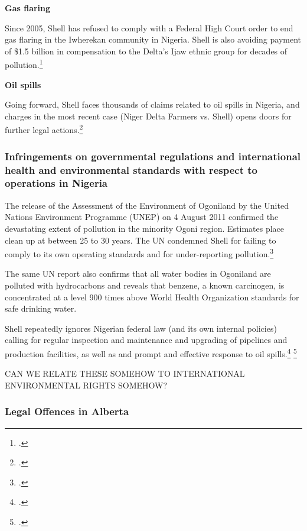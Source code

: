 \textbf{Gas flaring}

Since 2005, Shell has refused to comply with a Federal High Court order to end gas flaring in the Iwherekan community in Nigeria. Shell is also avoiding payment of \$1.5 billion in compensation to the Delta’s Ijaw ethnic group for decades of pollution.\footcite[][]{Ukala_2011}

\textbf{Oil spills}

Going forward, Shell faces thousands of claims related to oil spills in Nigeria, and charges in the most recent case (Niger Delta Farmers vs. Shell) opens doors for further legal actions.\footcite[][]{MixedVerdict_2012}



	\subsubsection{Infringements on governmental regulations and international health and   
	          environmental standards with respect to operations in Nigeria}
	
	
	
The release of the Assessment of the Environment of Ogoniland by the United Nations Environment Programme (UNEP) on 4 August 2011 confirmed the devastating extent of pollution in the minority Ogoni region. Estimates place clean up at between 25 to 30 years. The UN condemned Shell for failing to comply to its own operating standards and for under-reporting pollution.\footcite[][]{UNEP_2011}



The same UN report also confirms that all water bodies in Ogoniland are polluted with hydrocarbons and reveals that benzene, a known carcinogen, is concentrated at a level 900 times above World Health Organization standards for safe drinking water.



Shell repeatedly ignores Nigerian federal law (and its own internal policies) calling for regular inspection and maintenance and upgrading of pipelines and production facilities, as well as and prompt and effective response to oil spills.\footcite[][]{Steiner_2008}  \footcite[][]{Steiner_2010}


\begin{vcom}
CAN WE RELATE THESE SOMEHOW TO INTERNATIONAL ENVIRONMENTAL RIGHTS SOMEHOW?
\end{vcom}



	\subsubsection{Legal Offences in Alberta}
	



